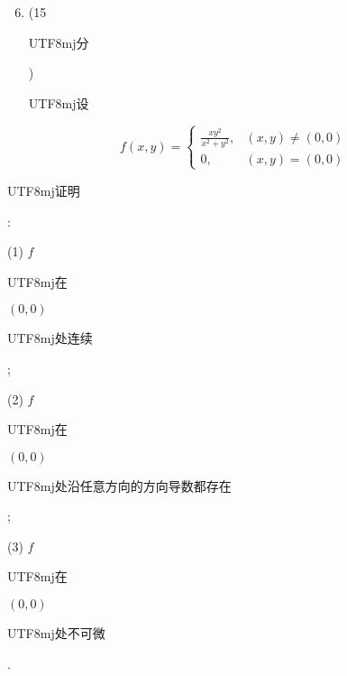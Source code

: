 \documentclass[10pt]{article}
\begin{document}
\begin{enumerate}
  \setcounter{enumi}{5}
  \item (15 \begin{CJK}{UTF8}{mj}分\end{CJK}) \begin{CJK}{UTF8}{mj}设\end{CJK}
\end{enumerate}
$$
f(x, y)= \begin{cases}\frac{x y^{2}}{x^{2}+y^{2}}, & (x, y) \neq(0,0) \\ 0, & (x, y)=(0,0)\end{cases}
$$
\begin{CJK}{UTF8}{mj}证明\end{CJK}:

(1) $f$ \begin{CJK}{UTF8}{mj}在\end{CJK} $(0,0)$ \begin{CJK}{UTF8}{mj}处连续\end{CJK};

(2) $f$ \begin{CJK}{UTF8}{mj}在\end{CJK} $(0,0)$ \begin{CJK}{UTF8}{mj}处沿任意方向的方向导数都存在\end{CJK};

(3) $f$ \begin{CJK}{UTF8}{mj}在\end{CJK} $(0,0)$ \begin{CJK}{UTF8}{mj}处不可微\end{CJK}.
\end{document}

